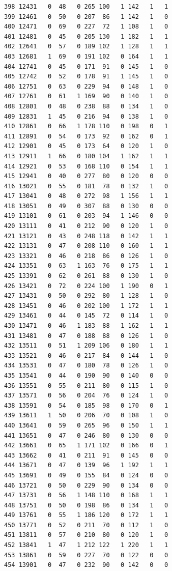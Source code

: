 \documentclass[
  letterpaper,
  DIV=11,
  numbers=noendperiod]{scrreprt}
\begin{document}
\begin{verbatim}
398 12431   0  48   0 265 100   1 142   1   1
399 12461   0  50   0 207  86   1 142   1   0
400 12471   0  69   0 227  72   1 108   1   0
401 12481   0  45   0 205 130   1 182   1   1
402 12641   0  57   0 189 102   1 128   1   1
403 12681   1  69   0 191 102   0 164   1   1
404 12741   0  45   0 171  91   0 145   1   0
405 12742   0  52   0 178  91   1 145   1   0
406 12751   0  63   0 229  94   0 148   1   0
407 12761   0  61   1 169  90   0 140   1   0
408 12801   0  48   0 238  88   0 134   1   0
409 12831   1  45   0 216  94   0 138   1   0
410 12861   0  66   1 178 110   0 198   0   1
411 12891   0  54   0 173  92   0 162   0   1
412 12901   0  45   0 173  64   0 120   1   0
413 12911   1  66   0 180 104   1 162   1   1
414 12921   0  53   0 168 110   0 154   1   1
415 12941   0  40   0 277  80   0 120   0   0
416 13021   0  55   0 181  78   0 132   1   0
417 13041   0  48   0 272  98   1 156   1   1
418 13051   0  49   0 307  88   0 130   0   0
419 13101   0  61   0 203  94   1 146   0   0
420 13111   0  41   0 212  90   0 120   1   0
421 13121   0  43   0 248 118   0 142   1   1
422 13131   0  47   0 208 110   0 160   1   1
423 13321   0  46   0 218  86   0 126   1   0
424 13351   0  63   1 163  76   0 175   1   1
425 13391   0  62   0 261  88   0 130   1   0
426 13421   0  72   0 224 100   1 190   0   1
427 13431   0  50   0 292  80   1 128   1   0
428 13451   0  46   0 202 100   1 172   1   1
429 13461   0  44   0 145  72   0 114   1   0
430 13471   0  46   1 183  88   1 162   1   1
431 13481   0  47   0 188  88   0 126   1   0
432 13511   0  51   1 209 106   0 180   1   1
433 13521   0  46   0 217  84   0 144   1   0
434 13531   0  47   0 180  78   0 126   1   0
435 13541   0  44   0 190  90   0 140   0   0
436 13551   0  55   0 211  80   0 115   1   0
437 13571   0  56   0 204  76   0 124   1   0
438 13591   0  54   0 185  98   0 170   0   1
439 13611   1  50   0 206  70   0 108   1   0
440 13641   0  59   0 265  96   0 150   1   1
441 13651   0  47   0 246  80   0 130   0   0
442 13661   0  65   1 171 102   0 166   0   1
443 13662   0  41   0 211  91   0 145   0   0
444 13671   0  47   0 139  96   1 192   1   1
445 13691   0  49   0 155  84   0 124   0   0
446 13721   0  50   0 229  90   0 134   0   0
447 13731   0  56   1 148 110   0 168   1   1
448 13751   0  50   0 198  86   0 134   1   0
449 13761   0  55   1 186 120   0 172   1   1
450 13771   0  52   0 211  70   0 112   1   0
451 13811   0  57   0 210  80   0 120   1   0
452 13841   1  47   1 212 122   1 220   1   1
453 13861   0  59   0 227  70   0 122   0   0
454 13901   0  47   0 232  90   0 142   0   0

\end{verbatim}
\end{document}
